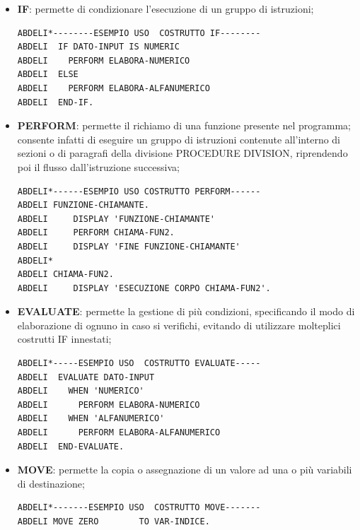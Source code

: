 \begin{itemize}
	\item \textbf{IF}: permette di condizionare l'esecuzione di un gruppo di istruzioni;
	\begin{lstlisting}[language=cobol, caption={Esempio d'uso costrutto IF in COBOL}]
ABDELI*--------ESEMPIO USO  COSTRUTTO IF--------
ABDELI 	IF DATO-INPUT IS NUMERIC
ABDELI 	  PERFORM ELABORA-NUMERICO
ABDELI	ELSE
ABDELI	  PERFORM ELABORA-ALFANUMERICO
ABDELI	END-IF.
	\end{lstlisting}
	
	\item \textbf{PERFORM}: permette il richiamo di una funzione presente nel programma; consente infatti di eseguire un gruppo di istruzioni contenute all’interno di sezioni o di paragrafi della divisione PROCEDURE DIVISION, riprendendo poi il flusso dall'istruzione successiva;
	\begin{lstlisting}[language=cobol, caption={Esempio d'uso costrutto PERFORM in COBOL}]
ABDELI*------ESEMPIO USO COSTRUTTO PERFORM------
ABDELI FUNZIONE-CHIAMANTE.
ABDELI     DISPLAY 'FUNZIONE-CHIAMANTE'
ABDELI 	   PERFORM CHIAMA-FUN2.
ABDELI     DISPLAY 'FINE FUNZIONE-CHIAMANTE'
ABDELI*
ABDELI CHIAMA-FUN2.
ABDELI     DISPLAY 'ESECUZIONE CORPO CHIAMA-FUN2'.
	\end{lstlisting}

	\item \textbf{EVALUATE}: permette la gestione di più condizioni, specificando il modo di elaborazione di ognuno in caso si verifichi, evitando di utilizzare molteplici costrutti IF innestati;
	\begin{lstlisting}[language=cobol, caption={Esempio d'uso costrutto EVALUATE in COBOL}]
ABDELI*-----ESEMPIO USO  COSTRUTTO EVALUATE-----
ABDELI 	EVALUATE DATO-INPUT
ABDELI	  WHEN 'NUMERICO'
ABDELI 	    PERFORM ELABORA-NUMERICO
ABDELI	  WHEN 'ALFANUMERICO'
ABDELI	    PERFORM ELABORA-ALFANUMERICO
ABDELI	END-EVALUATE.
	\end{lstlisting}

\newpage

	\item \textbf{MOVE}: permette la copia o assegnazione di un valore ad una o più variabili di destinazione;
	\begin{lstlisting}[language=cobol, caption={Esempio d'uso costrutto MOVE in COBOL}]
ABDELI*-------ESEMPIO USO  COSTRUTTO MOVE-------
ABDELI MOVE ZERO		TO VAR-INDICE.
	\end{lstlisting}




\end{itemize}
